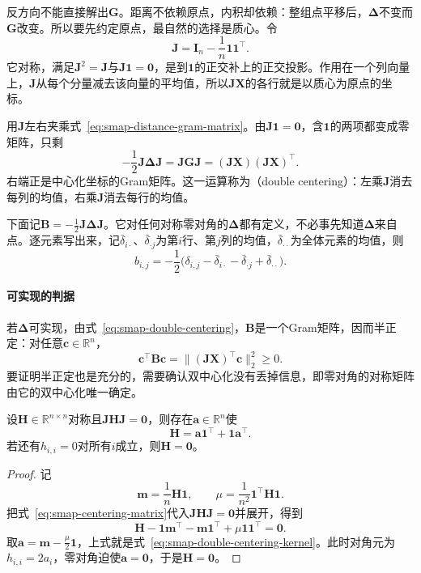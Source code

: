 反方向不能直接解出$\bm G$。距离不依赖原点，内积却依赖：整组点平移后，$\bm\Delta$不变而$\bm G$改变。所以要先约定原点，最自然的选择是质心。令
\begin{equation}
 \bm J=\bm I_n-\frac1n\bm1\bm1^\top .
 \label{eq:smap-centering-matrix}
\end{equation}
它对称，满足$\bm J^2=\bm J$与$\bm J\bm1=\bm0$，是到$\bm1$的正交补上的正交投影。作用在一个列向量上，$\bm J$从每个分量减去该向量的平均值，所以$\bm J\bm X$的各行就是以质心为原点的坐标。

用$\bm J$左右夹乘式~\eqref{eq:smap-distance-gram-matrix}。由$\bm J\bm1=\bm0$，含$\bm1$的两项都变成零矩阵，只剩
\begin{equation}
 -\frac12\bm J\bm\Delta\bm J=\bm J\bm G\bm J=(\bm J\bm X)(\bm J\bm X)^\top .
 \label{eq:smap-double-centering}
\end{equation}
右端正是中心化坐标的Gram矩阵。这一运算称为（double centering）：左乘$\bm J$消去每列的均值，右乘$\bm J$消去每行的均值。

下面记$\bm B=-\frac12\bm J\bm\Delta\bm J$。它对任何对称零对角的$\bm\Delta$都有定义，不必事先知道$\bm\Delta$来自点。逐元素写出来，记$\bar\delta_{i\cdot}$、$\bar\delta_{\cdot j}$为第$i$行、第$j$列的均值，$\bar\delta_{\cdot\cdot}$为全体元素的均值，则
\begin{equation}
 b_{i,j}=-\frac12\bigl(\delta_{i,j}-\bar\delta_{i\cdot}-\bar\delta_{\cdot j}+\bar\delta_{\cdot\cdot}\bigr).
 \label{eq:smap-double-centering-entry}
\end{equation}

\paragraph{可实现的判据}

若$\bm\Delta$可实现，由式~\eqref{eq:smap-double-centering}，$\bm B$是一个Gram矩阵，因而半正定：对任意$\bm c\in\mathbb R^n$，
\[
 \bm c^\top\bm B\bm c=\lVert(\bm J\bm X)^\top\bm c\rVert_2^2\geq0 .
\]
要证明半正定也是充分的，需要确认双中心化没有丢掉信息，即零对角的对称矩阵由它的双中心化唯一确定。

\begin{lemma}[双中心化的核]
\label{lem:smap-double-centering-kernel}
设$\bm H\in\mathbb R^{n\times n}$对称且$\bm J\bm H\bm J=\bm0$，则存在$\bm a\in\mathbb R^n$使
\begin{equation}
 \bm H=\bm a\bm1^\top+\bm1\bm a^\top .
 \label{eq:smap-double-centering-kernel}
\end{equation}
若还有$h_{i,i}=0$对所有$i$成立，则$\bm H=\bm0$。
\end{lemma}
\begin{proof}
记
\[
 \bm m=\frac1n\bm H\bm1,\qquad\mu=\frac1{n^2}\bm1^\top\bm H\bm1 .
\]
把式~\eqref{eq:smap-centering-matrix}代入$\bm J\bm H\bm J=\bm0$并展开，得到
\[
 \bm H-\bm1\bm m^\top-\bm m\bm1^\top+\mu\bm1\bm1^\top=\bm0 .
\]
取$\bm a=\bm m-\frac\mu2\bm1$，上式就是式~\eqref{eq:smap-double-centering-kernel}。此时对角元为$h_{i,i}=2a_i$，零对角迫使$\bm a=\bm0$，于是$\bm H=\bm0$。
\end{proof}

